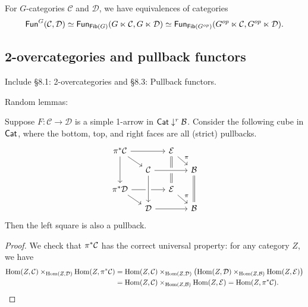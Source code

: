 \documentclass[a4paper,10pt
,draft
]{article}%
\renewcommand{\1}{\eta}%
\begin{document}
\begin{remark}
      For $G$-categories $\mathcal C$ and $\mathcal D$, we have equivalences of categories
      \begin{equation}
            \mathsf{Fun}^G(\mathcal C, \mathcal D)
            \simeq \mathsf{Fun}_{\mathsf{Fib}(G)}(G \ltimes \mathcal C, G \ltimes \mathcal D)
            \simeq \mathsf{Fun}_{\mathsf{Fib}(G^{op})}(G^{op} \ltimes \mathcal C, G^{op} \ltimes \mathcal D).
      \end{equation}
\end{remark}



\subsection{2-overcategories and pullback functors}

Include \S 8.1: 2-overcategories and \S 8.3: Pullback functors.

Random lemmas:

\begin{lemma}
      Suppose $F: \mathcal C \to \mathcal D$ is a simple 1-arrow in $\mathsf{Cat} \downarrow^r \mathcal B$.
      Consider the following cube in $\mathsf{Cat}$, where the bottom, top, and right faces are all (strict) pullbacks.
      \begin{equation}
            \begin{tikzcd}[row sep = small, column sep = small]
                  \pi^{\**} \mathcal C \arrow[rr] \arrow[dr] \arrow[dd]
                  &&
                  \mathcal E \arrow[dr, "\pi"] \arrow[dd, equal]
                  \\
                  &
                  \mathcal C \arrow[rr, crossing over]
                  &&
                  \mathcal B \arrow[dd, equal]
                  \\
                  \pi^{\**} \mathcal D \arrow[rr] \arrow[dr]
                  &&
                  \mathcal E \arrow[dr, "\pi"]
                  \\
                  &
                  \mathcal D \arrow[uu, crossing over, leftarrow] \arrow[rr]
                  &&
                  \mathcal B
            \end{tikzcd}
      \end{equation}
      Then the left square is also a pullback.
\end{lemma}
\begin{proof}
      We check that $\pi^{\**}\mathcal C$ has the correct universal property: for any category $Z$, we have
      \begin{align*}
        \Hom(Z,\mathcal C) \times_{\Hom(Z,\mathcal D)} \Hom(Z, \pi^{\**} \mathcal C)
        & =
          \Hom(Z, \mathcal C) \times_{\Hom(Z, \mathcal D)}\left(
          \Hom(Z, \mathcal D) \times_{\Hom(Z, \mathcal B)} \Hom(Z, \mathcal E)
          \right)
          \\
        & =
          \Hom(Z, \mathcal C) \times_{\Hom(Z, \mathcal B)}\Hom(Z, \mathcal E)
          = \Hom(Z, \pi^{\**}\mathcal C).
      \end{align*}
\end{proof}
\end{document}
